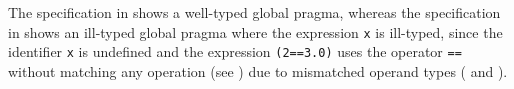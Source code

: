 
The specification in  shows a well-typed global pragma,
whereas the specification in  shows an ill-typed
global pragma where the expression \verb|x| is ill-typed, since the identifier \verb|x|
is undefined and the expression \verb|(2==3.0)| uses the operator \verb|==|
without matching any operation (see ) due to mismatched operand types
(\integertypeterm{} and \realtypeterm{}).

